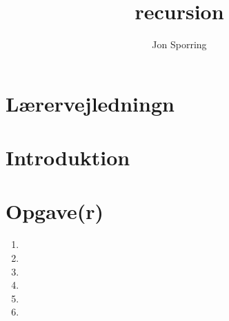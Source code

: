 \documentclass[a4paper,12pt]{article}
\title{recursion}
\author{Jon Sporring}
\begin{document}
\maketitle

\section{Lærervejledningn}

\section{Introduktion}

\section{Opgave(r)}
\begin{enumerate}
\item 
\item 
\item 
\item 
\item 
\item 
\end{enumerate}
\end{document}
